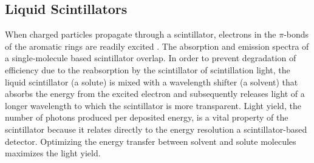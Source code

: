 \documentclass{JINST}
\begin{document}


\subsection{Liquid Scintillators}
When charged particles propagate through a scintillator, electrons in the $\pi$-bonds of the aromatic rings are readily excited \cite{birks64}. The absorption and emission spectra of a single-molecule based scintillator overlap. In order to prevent degradation of efficiency due to the reabsorption by the scintillator of scintillation light, the liquid scintillator (a solute) is mixed with a wavelength shifter (a solvent) that absorbs the energy from the excited electron and subsequently releases light of a longer wavelength to which the scintillator is more transparent. Light yield, the number of photons produced per deposited energy, is a vital property of the scintillator because it relates directly to the energy resolution a scintillator-based detector. Optimizing the energy transfer between solvent and solute molecules maximizes the light yield.
\end{document}
